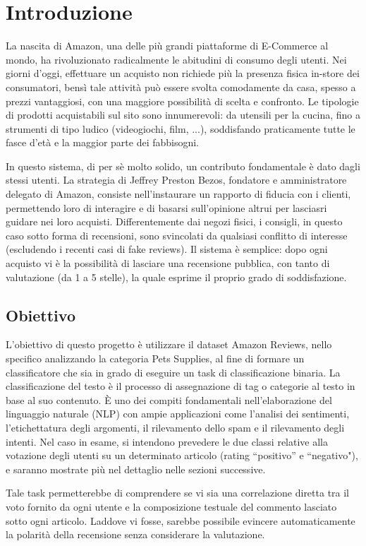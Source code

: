 \documentclass[fleqn,10pt]{SelfArx} %
\begin{document}


\section{Introduzione}
{\small

La nascita di Amazon,  una delle più grandi piattaforme di E-Commerce al mondo, ha rivoluzionato radicalmente le abitudini di consumo degli utenti.
Nei giorni d'oggi, effettuare un acquisto non richiede più la presenza fisica in-store dei consumatori, bensì tale attività può essere svolta comodamente da casa, spesso a prezzi vantaggiosi, con una maggiore possibilità di scelta e confronto. 
Le tipologie di prodotti acquistabili sul sito sono innumerevoli: da utensili per la cucina, fino a strumenti di tipo ludico (videogiochi, film, ...), soddisfando praticamente tutte le fasce d'età e la maggior parte dei fabbisogni.

In questo sistema, di per sè molto solido, un contributo fondamentale è dato dagli stessi utenti. La strategia di Jeffrey Preston Bezos, fondatore e amministratore delegato di Amazon, consiste nell'instaurare un rapporto di fiducia con i clienti, permettendo loro di interagire e di basarsi sull'opinione altrui per lasciasri guidare nei loro acquisti. Differentemente dai negozi fisici, i consigli, in questo caso sotto forma di recensioni, sono svincolati da qualsiasi conflitto di interesse (escludendo i recenti casi di fake reviews).
Il sistema è semplice: dopo ogni acquisto vi è la possibilità di lasciare una recensione pubblica, con tanto di valutazione (da 1 a 5 stelle), la quale esprime il proprio grado di soddisfazione.

\subsection{Obiettivo}

L'obiettivo di questo progetto è utilizzare il dataset Amazon Reviews, nello specifico analizzando la categoria Pets Supplies, al fine di formare un classificatore che sia in grado di eseguire un task di classificazione binaria.
La classificazione del testo è il processo di assegnazione di tag o categorie al testo in base al suo contenuto. È uno dei compiti fondamentali nell'elaborazione del linguaggio naturale (NLP) con ampie applicazioni come l'analisi dei sentimenti, l'etichettatura degli argomenti, il rilevamento dello spam e il rilevamento degli intenti.
Nel caso in esame, si intendono prevedere le due classi relative alla votazione degli utenti su un determinato articolo (rating “positivo” e “negativo"), e saranno mostrate più nel dettaglio nelle sezioni successive.

Tale task permetterebbe di comprendere se vi sia una correlazione diretta tra il voto fornito da ogni utente e la composizione testuale del commento lasciato sotto ogni articolo. Laddove vi fosse, sarebbe possibile evincere automaticamente la polarità della recensione senza considerare la valutazione.


}
\end{document}
